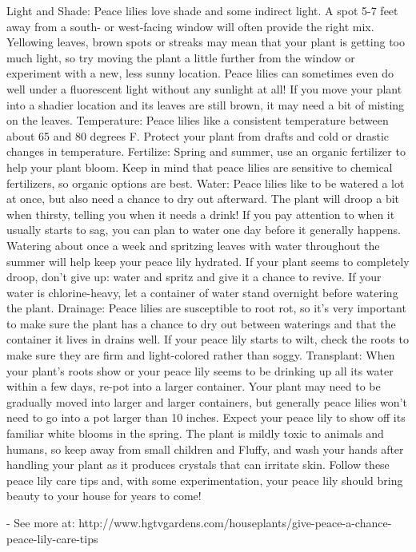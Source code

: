 \documentclass{book}
\begin{document}
Light and Shade: Peace lilies love shade and some indirect light. A spot 5-7 feet away from a south- or west-facing window will often provide the right mix. Yellowing leaves, brown spots or streaks may mean that your plant is getting too much light, so try moving the plant a little further from the window or experiment with a new, less sunny location. Peace lilies can sometimes even do well under a fluorescent light without any sunlight at all! If you move your plant into a shadier location and its leaves are still brown, it may need a bit of misting on the leaves.
Temperature: Peace lilies like a consistent temperature between about 65 and 80 degrees F. Protect your plant from drafts and cold or drastic changes in temperature.
Fertilize: Spring and summer, use an organic fertilizer to help your plant bloom. Keep in mind that peace lilies are sensitive to chemical fertilizers, so organic options are best.
Water: Peace lilies like to be watered a lot at once, but also need a chance to dry out afterward. The plant will droop a bit when thirsty, telling you when it needs a drink! If you pay attention to when it usually starts to sag,  you can plan to water one day before it generally happens. Watering about once a week and spritzing leaves with water throughout the summer will help keep your peace lily hydrated. If your plant seems to completely droop, don’t give up: water and spritz and give it a chance to revive. If your water is chlorine-heavy, let a container of water stand overnight before watering the plant.
Drainage: Peace lilies are susceptible to root rot, so it’s very important to make sure the plant has a chance to dry out between waterings and that the container it lives in drains well. If your peace lily starts to wilt, check the roots to make sure they are firm and light-colored rather than soggy.
Transplant: When your plant’s roots show or your peace lily seems to be drinking up all its water within a few days, re-pot into a larger container. Your plant may need to be gradually moved into larger and larger containers, but generally peace lilies won’t need to go into a pot larger than 10 inches.
Expect your peace lily to show off its familiar white blooms in the spring. The plant is mildly toxic to animals and humans, so keep away from small children and Fluffy, and wash your hands after handling your plant as it produces crystals that can irritate skin. Follow these peace lily care tips and, with some experimentation, your peace lily should bring beauty to your house for years to come!

- See more at: http://www.hgtvgardens.com/houseplants/give-peace-a-chance-peace-lily-care-tips
\end{document}
